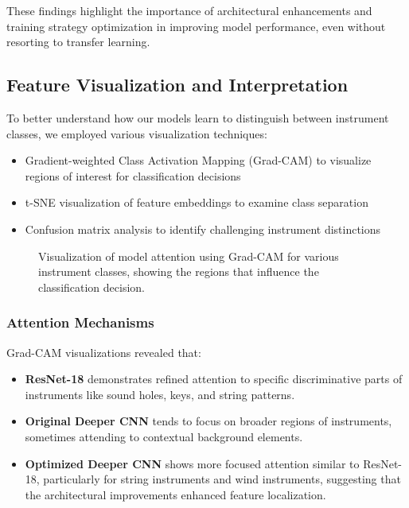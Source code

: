 These findings highlight the importance of architectural enhancements and training strategy optimization in improving model performance, even without resorting to transfer learning.

\subsection{Feature Visualization and Interpretation}
To better understand how our models learn to distinguish between instrument classes, we employed various visualization techniques:
\begin{itemize}
    \item Gradient-weighted Class Activation Mapping (Grad-CAM) to visualize regions of interest for classification decisions
    \item t-SNE visualization of feature embeddings to examine class separation
    \item Confusion matrix analysis to identify challenging instrument distinctions
\end{itemize}

\begin{figure}[ht]
    \centering
    \caption{Visualization of model attention using Grad-CAM for various instrument classes, showing the regions that influence the classification decision.}
    \label{fig:gradcam}
\end{figure}

\subsubsection{Attention Mechanisms}
Grad-CAM visualizations revealed that:
\begin{itemize}
    \item \textbf{ResNet-18} demonstrates refined attention to specific discriminative parts of instruments like sound holes, keys, and string patterns.
    
    \item \textbf{Original Deeper CNN} tends to focus on broader regions of instruments, sometimes attending to contextual background elements.
    
    \item \textbf{Optimized Deeper CNN} shows more focused attention similar to ResNet-18, particularly for string instruments and wind instruments, suggesting that the architectural improvements enhanced feature localization.
\end{itemize}

